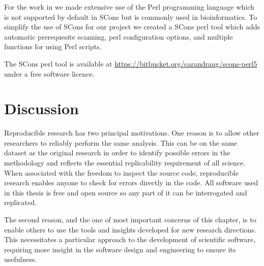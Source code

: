 
For the work in  we made extensive use of
the Perl programming language which is not supported by default in
SCons but is commonly used in bioinformatics.
To simplify the use of SCons for our project we created
a SCons perl tool which adds automatic prerequesite
scanning, perl configuration options, and multiple functions for using
Perl scripts.

The SCons perl tool is available at
\url{https://bitbucket.org/carandraug/scons-perl5} under a free
software licence.


\section{Discussion}

Reproducible research has two principal motivations.
One reason is to allow other
researchers to reliably perform the same analysis.  This can be on the same
dataset as the original research in order to identify possible errors in the
methodology and reflects the essential replicability requirement of all science.
When associated with the freedom to inspect the
source code, reproducible research enables anyone
to check for errors directly in the
code.  All software used in this thesis is free and open source so any
part of it can be interrogated and replicated.

The second reason, and the one of most important concerns of this chapter, is to
enable others to use the tools and insights
developed for new research directions.  This
necessitates a particular approach to the development of scientific
software, requiring more insight in the software design and
engineering to ensure its usefulness.

